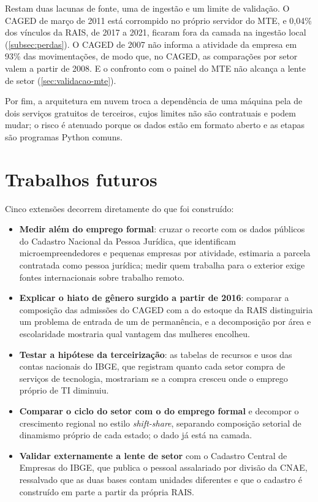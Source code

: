 Restam duas lacunas de fonte, uma de ingestão e um limite de validação. O CAGED de março de 2011 está corrompido no próprio servidor do MTE, e 0,04\% dos vínculos da RAIS, de 2017 a 2021, ficaram fora da camada na ingestão local (\autoref{subsec:perdas}). O CAGED de 2007 não informa a atividade da empresa em 93\% das movimentações, de modo que, no CAGED, as comparações por setor valem a partir de 2008. E o confronto com o painel do MTE não alcança a lente de setor (\autoref{sec:validacao-mte}).

Por fim, a arquitetura em nuvem troca a dependência de uma máquina pela de dois serviços gratuitos de terceiros, cujos limites não são contratuais e podem mudar; o risco é atenuado porque os dados estão em formato aberto e as etapas são programas Python comuns.

\section{Trabalhos futuros}

Cinco extensões decorrem diretamente do que foi construído:

\begin{itemize}
    \item \textbf{Medir além do emprego formal}: cruzar o recorte com os dados públicos do Cadastro Nacional da Pessoa Jurídica, que identificam microempreendedores e pequenas empresas por atividade, estimaria a parcela contratada como pessoa jurídica; medir quem trabalha para o exterior exige fontes internacionais sobre trabalho remoto.
    \item \textbf{Explicar o hiato de gênero surgido a partir de 2016}: comparar a composição das admissões do CAGED com a do estoque da RAIS distinguiria um problema de entrada de um de permanência, e a decomposição por área e escolaridade mostraria qual vantagem das mulheres encolheu.
    \item \textbf{Testar a hipótese da terceirização}: as tabelas de recursos e usos das contas nacionais do IBGE, que registram quanto cada setor compra de serviços de tecnologia, mostrariam se a compra cresceu onde o emprego próprio de TI diminuiu.
    \item \textbf{Comparar o ciclo do setor com o do emprego formal} e decompor o crescimento regional no estilo \textit{shift-share}, separando composição setorial de dinamismo próprio de cada estado; o dado já está na camada.
    \item \textbf{Validar externamente a lente de setor} com o Cadastro Central de Empresas do IBGE, que publica o pessoal assalariado por divisão da CNAE, ressalvado que as duas bases contam unidades diferentes e que o cadastro é construído em parte a partir da própria RAIS.
\end{itemize}

